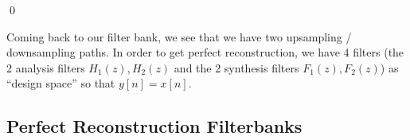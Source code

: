 \qed


Coming back to our filter bank, we see that we have two upsampling / downsampling paths. In order to get perfect reconstruction, we have 4 filters (the 2 analysis filters $H_1(z), H_2(z)$ and the 2 synthesis filters $F_1(z), F_2(z)$) as ``design space'' so that $y[n] = x[n]$.


\subsection*{Perfect Reconstruction Filterbanks}


